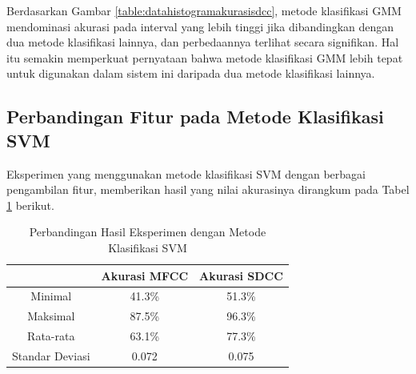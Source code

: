   Berdasarkan Gambar \ref{table:datahistogramakurasisdcc}, metode klasifikasi GMM mendominasi akurasi pada interval yang lebih tinggi jika dibandingkan dengan dua metode klasifikasi lainnya, dan perbedaannya terlihat secara signifikan. Hal itu semakin memperkuat pernyataan bahwa metode klasifikasi GMM lebih tepat untuk digunakan dalam sistem ini daripada dua metode klasifikasi lainnya.

  







  \subsection{Perbandingan Fitur pada Metode Klasifikasi SVM}
  Eksperimen yang menggunakan metode klasifikasi SVM dengan berbagai pengambilan fitur, memberikan hasil yang nilai akurasinya dirangkum pada Tabel \ref{table:perbandingansvm} berikut.

  \begin{table}
    \centering
    \caption{Perbandingan Hasil Eksperimen dengan Metode Klasifikasi SVM}
    \begin{tabular}{|c|c|c|}
      \hline
       & Akurasi MFCC & Akurasi SDCC \\ \hline
      Minimal         & 41.3\% & 51.3\% \\ \hline
      Maksimal        & 87.5\% & 96.3\% \\ \hline
      Rata-rata       & 63.1\% & 77.3\% \\ \hline
      Standar Deviasi & 0.072  & 0.075  \\ \hline
    \end{tabular}
    \label{table:perbandingansvm}
  \end{table}

